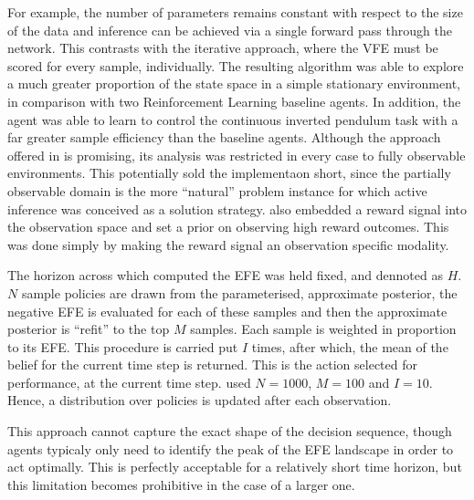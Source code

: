 \documentclass[onecolumn]{IEEEtran}
\begin{document}
For example, the number of parameters remains constant with respect to the size of the data and inference can be achieved via a single forward pass through the network. This contrasts with the iterative approach, where the VFE must be scored for every sample, individually. The resulting algorithm was able to explore a much greater proportion of the state space in a simple stationary environment, in comparison with two Reinforcement Learning baseline agents. In addition, the agent was able to learn to control the continuous inverted pendulum task with a far greater sample efficiency than the baseline agents. Although the approach offered in \textcite{Scaling-AIF} is promising, its analysis was restricted in every case to fully observable environments. This potentially sold the implementaon short, since the partially observable domain is the more ``natural'' problem instance for which active inference was conceived as a solution strategy. \textcite{Scaling-AIF} also embedded a reward signal into the observation space and set a prior on observing high reward outcomes. This was done simply by making the reward signal an observation specific modality. 

The horizon across which \textcite{Scaling-AIF} computed the EFE was held fixed, and dennoted as $H$. $N$ sample policies are drawn from the parameterised, approximate posterior, the negative EFE is evaluated for each of these samples and then the approximate posterior is ``refit'' to the top $M$ samples. Each sample is weighted in proportion to its EFE. This procedure is carried put $I$ times, after which, the mean of the belief for the current time step is returned. This is the action selected for performance, at the current time step. \textcite{Scaling-AIF} used $N = 1000$, $M = 100$ and $I = 10$. Hence, a distribution over policies is updated after each observation.

This approach cannot capture the exact shape of the decision sequence, though agents typicaly only need to identify the peak of the EFE landscape in order to act optimally. This is perfectly acceptable for a relatively short time horizon, but this limitation becomes prohibitive in the case of a larger one. 
\end{document}
